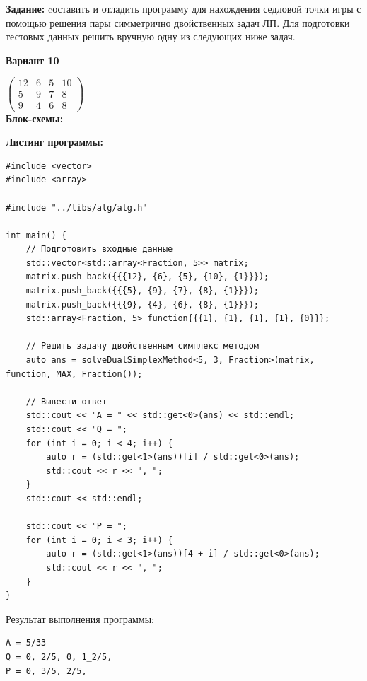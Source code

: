 \documentclass[a4paper,14pt]{extarticle}
\begin{document}
\textbf{Задание: }cоставить и отладить программу для нахождения седловой точки
игры с помощью решения пары симметрично двойственных задач
ЛП. Для подготовки тестовых данных решить вручную одну из
следующих ниже задач.

\begin{center}
    \textbf{Вариант 10}
\end{center}
$\begin{pmatrix}
12&6&5&10\\
5&9&7&8\\
9&4&6&8
\end{pmatrix}$\\

\textbf{Блок-схемы: }
\begin{center}
    \bigbreak
\end{center}

\textbf{Листинг программы: }
\begin{verbatim}
#include <vector>
#include <array>

#include "../libs/alg/alg.h"

int main() {
    // Подготовить входные данные
    std::vector<std::array<Fraction, 5>> matrix;
    matrix.push_back({{{12}, {6}, {5}, {10}, {1}}});
    matrix.push_back({{{5}, {9}, {7}, {8}, {1}}});
    matrix.push_back({{{9}, {4}, {6}, {8}, {1}}});
    std::array<Fraction, 5> function{{{1}, {1}, {1}, {1}, {0}}};

    // Решить задачу двойственным симплекс методом
    auto ans = solveDualSimplexMethod<5, 3, Fraction>(matrix, function, MAX, Fraction());

    // Вывести ответ
    std::cout << "A = " << std::get<0>(ans) << std::endl;
    std::cout << "Q = ";
    for (int i = 0; i < 4; i++) {
        auto r = (std::get<1>(ans))[i] / std::get<0>(ans);
        std::cout << r << ", ";
    }
    std::cout << std::endl;

    std::cout << "P = ";
    for (int i = 0; i < 3; i++) {
        auto r = (std::get<1>(ans))[4 + i] / std::get<0>(ans);
        std::cout << r << ", ";
    }
}
\end{verbatim}

Результат выполнения программы:
\begin{verbatim}
A = 5/33
Q = 0, 2/5, 0, 1_2/5,
P = 0, 3/5, 2/5,
\end{verbatim}
\end{document}
